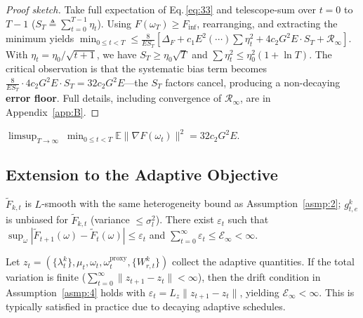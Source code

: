\begin{proof}[Proof sketch]
  Take full expectation of Eq.\,\eqref{eq:33} and telescope-sum over \(t = 0\) to \(T-1\) (\(S_T \triangleq \sum_{t=0}^{T-1}\eta_t\)).
  Using \(F(\omega_T) \ge F_{\inf}\), rearranging, and extracting the minimum yields
  \(\min_{0\le t<T} \le \frac{8}{E S_T}[\Delta_F + c_1 E^2(\cdots)\sum\eta_t^2 + 4c_2 G^2 E \cdot S_T + \mathcal R_\infty]\).
  With \(\eta_t = \eta_0/\sqrt{t+1}\), we have \(S_T \ge \eta_0\sqrt{T}\) and \(\sum\eta_t^2 \le \eta_0^2(1 + \ln T)\).
  The critical observation is that the systematic bias term becomes \(\frac{8}{E S_T}\cdot 4c_2 G^2 E \cdot S_T = 32 c_2 G^2 E\)---the \(S_T\) factors cancel, producing a non-decaying \textbf{error floor}.
  Full details, including convergence of \(\mathcal R_\infty\), are in Appendix~\ref{app:B}.
\end{proof}

\begin{corollary}\label{cor:1}
  \(\displaystyle \limsup_{T\to\infty}\;\min_{0\le t<T} \mathbb E\|\nabla F(\omega_t)\|^2 = 32 c_2 G^2 E\).
\end{corollary}

\subsection{Extension to the Adaptive Objective}

\begin{assumption}\label{asmp:4}
  \(\widetilde F_{k,t}\) is \(L\)-smooth with the same heterogeneity bound as Assumption~\ref{asmp:2};
  \(g_{t,e}^k\) is unbiased for \(\widetilde F_{k,t}\) (variance \(\le \sigma_l^2\)).
  There exist \(\varepsilon_t\) such that
  \(\sup_\omega |\widetilde F_{t+1}(\omega) - \widetilde F_t(\omega)| \le \varepsilon_t\)
  and \(\sum_{t=0}^{\infty} \varepsilon_t \le \mathcal E_\infty < \infty\).
\end{assumption}

\begin{proposition}\label{prop:4}
  Let \(z_t = (\{\lambda_t^k\}, \mu_t, \omega_t, \omega_t^{\mathrm{proxy}}, \{W_{r,t}^k\})\) collect the adaptive quantities.
  If the total variation is finite (\(\sum_{t=0}^{\infty}\|z_{t+1} - z_t\| < \infty\)),
  then the drift condition in Assumption~\ref{asmp:4} holds with
  \(\varepsilon_t = L_z\|z_{t+1} - z_t\|\), yielding \(\mathcal E_\infty < \infty\).
  This is typically satisfied in practice due to decaying adaptive schedules.
\end{proposition}


